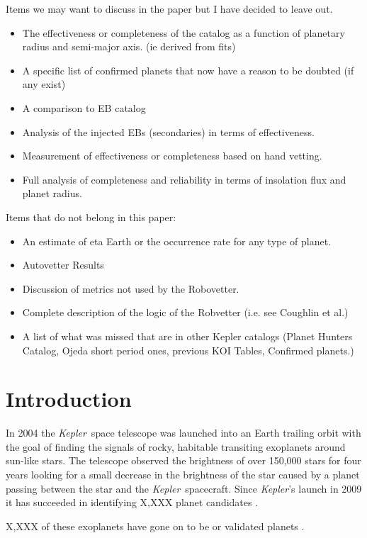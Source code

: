 \documentclass[onecolumn]{aastex6}
\newcommand\Kepler{\textit{Kepler}}
\begin{document}
Items we may want to discuss in the paper but I have decided to leave out.
\begin{itemize}
\item The effectiveness or completeness of the catalog as a function of planetary radius and semi-major axis. (ie derived from fits) 
\item A specific list of confirmed planets that now have a reason to be doubted (if any exist)
\item A comparison to EB catalog
\item Analysis of the injected EBs (secondaries) in terms of effectiveness.
\item Measurement of effectiveness or completeness based on hand vetting.
\item Full analysis of completeness and reliability in terms of insolation flux and planet radius. 
\end{itemize}

Items that do not belong in this paper:
\begin{itemize}
\item An estimate of eta Earth or the occurrence rate for any type of planet.
\item Autovetter Results
\item Discussion of metrics not used by the Robovetter.
\item Complete description of the logic of the Robvetter (i.e. see Coughlin et al.)
\item A list of what was missed that are in other Kepler catalogs (Planet Hunters Catalog, Ojeda short period ones, previous KOI Tables, Confirmed planets.)
\end{itemize}

\section{Introduction}

In 2004 the \Kepler\ space telescope was launched into an Earth trailing orbit  with the goal of finding the signals of rocky, habitable transiting exoplanets \citep{Koch2010} around sun-like stars. The telescope observed the brightness of over 150,000 stars for four years looking for a small decrease in the brightness of the star caused by a planet passing between the star and the \Kepler\ spacecraft. 
Since \Kepler's launch in 2009 it has succeeded in identifying X,XXX planet candidates \citep{Borucki2010,Coughlin20016}. 

X,XXX of these exoplanets have gone on to be   \citep[e.g.][]{FOP?} or validated planets \citep[see most recently][]{Morton2016}. 
\end{document}
